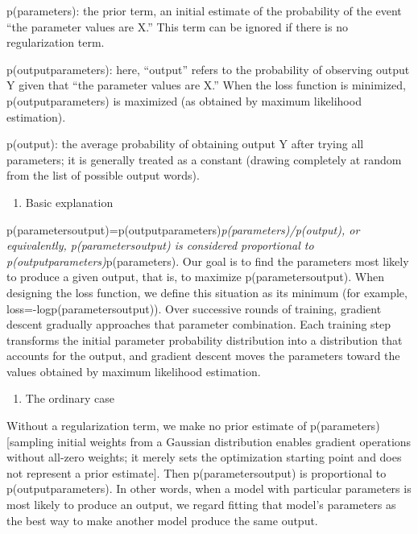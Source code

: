 p(parameters): the prior term, an initial estimate of the probability of the event ``the parameter values are X.'' This term can be ignored if there is no regularization term.

p(output\textbar parameters): here, ``output'' refers to the probability of observing output Y given that ``the parameter values are X.'' When the loss function is minimized, p(output\textbar parameters) is maximized (as obtained by maximum likelihood estimation).

p(output): the average probability of obtaining output Y after trying all parameters; it is generally treated as a constant (drawing completely at random from the list of possible output words).

\begin{enumerate}
\def\labelenumi{(\arabic{enumi})}
\setcounter{enumi}{1}
\tightlist
\item
  Basic explanation
\end{enumerate}

p(parameters\textbar output)=p(output\textbar parameters)\emph{p(parameters)/p(output), or equivalently, p(parameters\textbar output) is considered proportional to p(output\textbar parameters)}p(parameters). Our goal is to find the parameters most likely to produce a given output, that is, to maximize p(parameters\textbar output). When designing the loss function, we define this situation as its minimum (for example, loss=-logp(parameters\textbar output)). Over successive rounds of training, gradient descent gradually approaches that parameter combination. Each training step transforms the initial parameter probability distribution into a distribution that accounts for the output, and gradient descent moves the parameters toward the values obtained by maximum likelihood estimation.

\begin{enumerate}
\def\labelenumi{(\arabic{enumi})}
\setcounter{enumi}{2}
\tightlist
\item
  The ordinary case
\end{enumerate}

Without a regularization term, we make no prior estimate of p(parameters) {[}sampling initial weights from a Gaussian distribution enables gradient operations without all-zero weights; it merely sets the optimization starting point and does not represent a prior estimate{]}. Then p(parameters\textbar output) is proportional to p(output\textbar parameters). In other words, when a model with particular parameters is most likely to produce an output, we regard fitting that model's parameters as the best way to make another model produce the same output.

